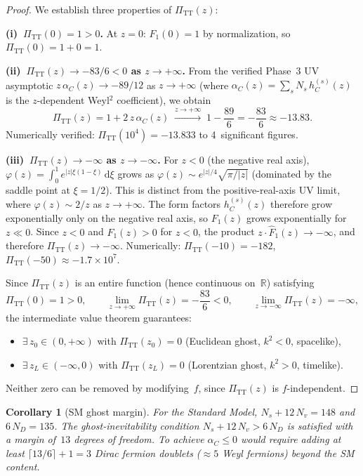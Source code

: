 \documentclass[11pt,a4paper]{article}
\newcommand{\PiTT}{\Pi_{\mathrm{TT}}}
\newcommand{\Fhat}{\hat{F}}
\newcommand{\dd}{\mathrm{d}}
\newtheorem{corollary}[theorem]{Corollary}
\begin{document}
\begin{proof}
We establish three properties of $\PiTT(z)$:

\textbf{(i)~$\PiTT(0) = 1 > 0$.}
At $z = 0$: $\Fhat_1(0) = 1$ by normalization, so
$\PiTT(0) = 1 + 0 = 1$.

\textbf{(ii)~$\PiTT(z) \to -83/6 < 0$ as $z \to +\infty$.}
From the verified Phase~3 UV asymptotic
$z\,\alpha_C(z) \to -89/12$ as $z \to +\infty$
(where $\alpha_C(z) = \sum_s N_s\,h_C^{(s)}(z)$ is the
$z$-dependent Weyl${}^2$ coefficient), we obtain
\begin{equation}
  \PiTT(z) = 1 + 2\,z\,\alpha_C(z)
  \;\xrightarrow{z \to +\infty}\;
  1 - \frac{89}{6} = -\frac{83}{6} \approx -13.83.
\end{equation}
Numerically verified: $\PiTT(10^4) = -13.833$ to 4~significant
figures.

\textbf{(iii)~$\PiTT(z) \to -\infty$ as $z \to -\infty$.}
For $z < 0$ (the negative real axis), $\varphi(z) = \int_0^1 e^{|z|\xi(1-\xi)}\,\dd\xi$
grows as $\varphi(z) \sim e^{|z|/4}\sqrt{\pi/|z|}$ (dominated by
the saddle point at $\xi = 1/2$).  This is distinct from the
positive-real-axis UV limit, where $\varphi(z) \sim 2/z$ as $z \to +\infty$.
The form factors $h_C^{(s)}(z)$ therefore grow exponentially only on
the negative real axis, so $F_1(z)$ grows exponentially for
$z \ll 0$.  Since $z < 0$ and $F_1(z) > 0$ for $z < 0$, the product
$z \cdot \Fhat_1(z) \to -\infty$, and therefore
$\PiTT(z) \to -\infty$.
Numerically: $\PiTT(-10) = -182$, $\PiTT(-50) \approx -1.7 \times 10^7$.

\medskip
Since $\PiTT(z)$ is an entire function (hence continuous on~$\mathbb{R}$)
satisfying
\[
  \PiTT(0) = 1 > 0,
  \qquad
  \lim_{z \to +\infty} \PiTT(z) = -\frac{83}{6} < 0,
  \qquad
  \lim_{z \to -\infty} \PiTT(z) = -\infty,
\]
the intermediate value theorem guarantees:
\begin{itemize}
  \item $\exists\, z_0 \in (0, +\infty)$ with $\PiTT(z_0) = 0$
    \quad (Euclidean ghost, $k^2 < 0$, spacelike),
  \item $\exists\, z_L \in (-\infty, 0)$ with $\PiTT(z_L) = 0$
    \quad (Lorentzian ghost, $k^2 > 0$, timelike).
\end{itemize}
Neither zero can be removed by modifying~$f$, since $\PiTT(z)$ is
$f$-independent.
\end{proof}


\begin{corollary}[SM ghost margin]
\label{cor:margin}
For the Standard Model, $N_s + 12\,N_v = 148$ and $6\,N_D = 135$.
The ghost-inevitability condition $N_s + 12\,N_v > 6\,N_D$ is
satisfied with a margin of~$13$ degrees of freedom.  To achieve
$\alpha_C \leq 0$ would require adding at least $\lceil 13/6 \rceil + 1
= 3$ Dirac fermion doublets ($\approx 5$ Weyl fermions) beyond the SM
content.
\end{corollary}
\end{document}
